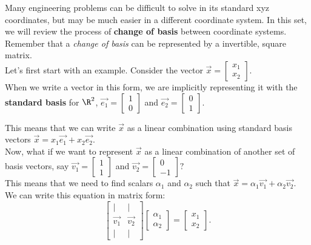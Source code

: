 


Many engineering problems can be difficult to solve in its standard xyz coordinates, but may be much easier in a different coordinate system.
In this set, we will review the process of \textbf{change of basis} between coordinate systems.
Remember that a \emph{change of basis} can be represented by a invertible, square matrix. \\

Let's first start with an example.
Consider the vector $\vec{x} = \begin{bmatrix} x_1 \\ x_2 \end{bmatrix}.$ \\
When we write a vector in this form, we are implicitly representing it with the \textbf{standard basis} for $\R^{2}$, $\vec{e_1} = \begin{bmatrix} 1 \\ 0 \end{bmatrix}$ and $\vec{e_2} = \begin{bmatrix} 0 \\ 1 \end{bmatrix}.$ 

This means that we can write $\vec{x}$ as a linear combination using standard basis vectors $\vec{x} = x_1\vec{e_1} + x_2\vec{e_2}$.\\

Now, what if we want to represent $\vec{x}$ as a linear combination of another set of basis vectors, say $\vec{v_1} = \begin{bmatrix} 1 \\ 1 \end{bmatrix}$ and $\vec{v_2} = \begin{bmatrix} 0 \\ -1 \end{bmatrix}?$ \\

This means that we need to find scalars $\alpha_{1}$ and $\alpha_{2}$ such that $\vec{x} = \alpha_1 \vec{v_1} + \alpha_2 \vec{v_2}$.
We can write this equation in matrix form:
\[
  \begin{bmatrix}
    | & | \\
    \vec{v_1} & \vec{v_2} \\
    | & |
  \end{bmatrix}
  \begin{bmatrix} \alpha_1 \\ \alpha_2 \end{bmatrix} = \begin{bmatrix} x_1 \\ x_2 \end{bmatrix}
.\]

